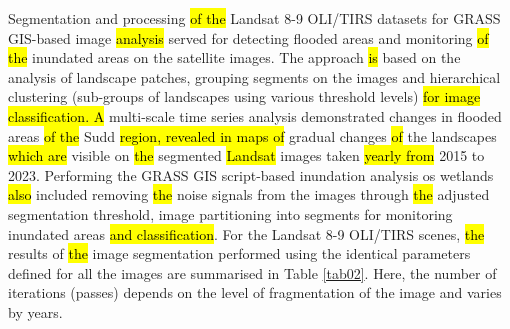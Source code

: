 \documentclass[sustainability,article,submit,pdftex,moreauthors]{Definitions/mdpi}
\begin{document}
Segmentation and processing \hl{of the }Landsat 8-9 OLI/TIRS datasets for GRASS GIS-based image \hl{analysis} served for detecting flooded areas and monitoring \hl{of the }inundated areas on the satellite images. The approach \hl{is} based on\hl{ }the analysis of landscape patches, grouping segments on the images and hierarchical clustering (sub-groups of landscapes using various threshold levels) \hl{for image classification. A} multi-scale time series analysis demonstrated changes in flooded areas \hl{of the} Sudd \hl{region, revealed in maps of }gradual changes \hl{of} the landscapes \hl{which are }visible\hl{ }on \hl{the }segmented \hl{Landsat }images\hl{ }taken \hl{yearly from} 2015 to 2023. Performing the GRASS GIS script-based inundation analysis os wetlands \hl{also }included removing \hl{the }noise signals from the images through \hl{the }adjusted segmentation threshold, image partitioning into segments for monitoring inundated areas \hl{and classification}. For the Landsat 8-9 OLI/TIRS scenes, \hl{the} results of \hl{the }image segmentation performed using the identical parameters defined for all the images are summarised in Table \ref{tab02}. Here, the number of iterations (passes) depends on the level of fragmentation of the image and varies by years.
\end{document}
